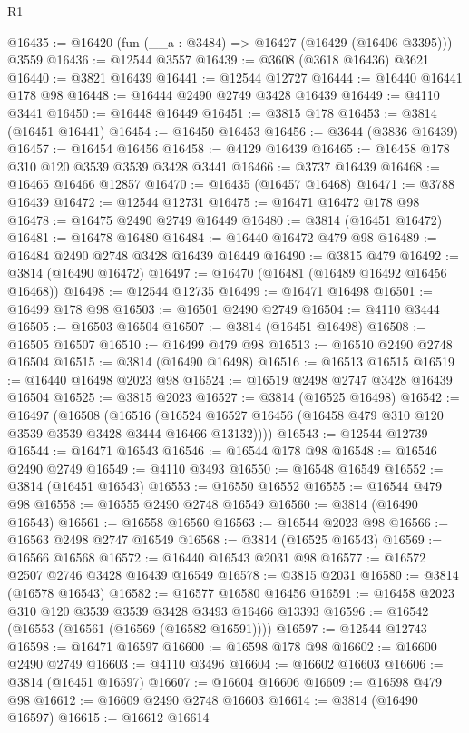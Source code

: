 \begin{lexlean}{R1}
\begin{coremodule}
@16435 := @16420 (fun (__a : @3484) => @16427 (@16429 (@16406 @3395))) @3559
@16436 := @12544 @3557
@16439 := @3608 (@3618 @16436) @3621
@16440 := @3821 @16439
@16441 := @12544 @12727
@16444 := @16440 @16441 @178 @98
@16448 := @16444 @2490 @2749 @3428 @16439
@16449 := @4110 @3441
@16450 := @16448 @16449
@16451 := @3815 @178
@16453 := @3814 (@16451 @16441)
@16454 := @16450 @16453
@16456 := @3644 (@3836 @16439)
@16457 := @16454 @16456
@16458 := @4129 @16439
@16465 := @16458 @178 @310 @120 @3539 @3539 @3428 @3441
@16466 := @3737 @16439
@16468 := @16465 @16466 @12857
@16470 := @16435 (@16457 @16468)
@16471 := @3788 @16439
@16472 := @12544 @12731
@16475 := @16471 @16472 @178 @98
@16478 := @16475 @2490 @2749 @16449
@16480 := @3814 (@16451 @16472)
@16481 := @16478 @16480
@16484 := @16440 @16472 @479 @98
@16489 := @16484 @2490 @2748 @3428 @16439 @16449
@16490 := @3815 @479
@16492 := @3814 (@16490 @16472)
@16497 := @16470 (@16481 (@16489 @16492 @16456 @16468))
@16498 := @12544 @12735
@16499 := @16471 @16498
@16501 := @16499 @178 @98
@16503 := @16501 @2490 @2749
@16504 := @4110 @3444
@16505 := @16503 @16504
@16507 := @3814 (@16451 @16498)
@16508 := @16505 @16507
@16510 := @16499 @479 @98
@16513 := @16510 @2490 @2748 @16504
@16515 := @3814 (@16490 @16498)
@16516 := @16513 @16515
@16519 := @16440 @16498 @2023 @98
@16524 := @16519 @2498 @2747 @3428 @16439 @16504
@16525 := @3815 @2023
@16527 := @3814 (@16525 @16498)
@16542 := @16497
    (@16508
      (@16516 (@16524 @16527 @16456 (@16458 @479 @310 @120 @3539 @3539 @3428 @3444 @16466 @13132))))
@16543 := @12544 @12739
@16544 := @16471 @16543
@16546 := @16544 @178 @98
@16548 := @16546 @2490 @2749
@16549 := @4110 @3493
@16550 := @16548 @16549
@16552 := @3814 (@16451 @16543)
@16553 := @16550 @16552
@16555 := @16544 @479 @98
@16558 := @16555 @2490 @2748 @16549
@16560 := @3814 (@16490 @16543)
@16561 := @16558 @16560
@16563 := @16544 @2023 @98
@16566 := @16563 @2498 @2747 @16549
@16568 := @3814 (@16525 @16543)
@16569 := @16566 @16568
@16572 := @16440 @16543 @2031 @98
@16577 := @16572 @2507 @2746 @3428 @16439 @16549
@16578 := @3815 @2031
@16580 := @3814 (@16578 @16543)
@16582 := @16577 @16580 @16456
@16591 := @16458 @2023 @310 @120 @3539 @3539 @3428 @3493 @16466 @13393
@16596 := @16542 (@16553 (@16561 (@16569 (@16582 @16591))))
@16597 := @12544 @12743
@16598 := @16471 @16597
@16600 := @16598 @178 @98
@16602 := @16600 @2490 @2749
@16603 := @4110 @3496
@16604 := @16602 @16603
@16606 := @3814 (@16451 @16597)
@16607 := @16604 @16606
@16609 := @16598 @479 @98
@16612 := @16609 @2490 @2748 @16603
@16614 := @3814 (@16490 @16597)
@16615 := @16612 @16614

\end{coremodule}
\end{lexlean}
